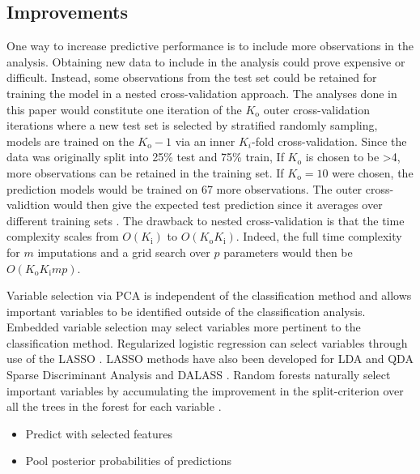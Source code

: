 \documentclass[12pt,]{article}
\providecommand{\tightlist}{%
  \setlength{\itemsep}{0pt}\setlength{\parskip}{0pt}}
\begin{document}
\subsection{Improvements}\label{improvements}

One way to increase predictive performance is to include more
observations in the analysis. Obtaining new data to include in the
analysis could prove expensive or difficult. Instead, some observations
from the test set could be retained for training the model in a nested
cross-validation approach. The analyses done in this paper would
constitute one iteration of the \(K_\text{o}\) outer cross-validation
iterations where a new test set is selected by stratified randomly
sampling, models are trained on the \(K_\text{o}-1\) via an inner
\(K_{i}\)-fold cross-validation. Since the data was originally split
into 25\% test and 75\% train, If \(K_\text{o}\) is chosen to be
\textgreater{}4, more observations can be retained in the training set.
If \(K_\text{o}=10\) were chosen, the prediction models would be trained
on 67 more observations. The outer cross-validtion would then give the
expected test prediction since it averages over different training sets
\autocite{hastie_elements_2009}. The drawback to nested cross-validation
is that the time complexity scales from \(O(K_\text{i})\) to
\(O(K_\text{o}K_\text{i})\). Indeed, the full time complexity for \(m\)
imputations and a grid search over \(p\) parameters would then be
\(O(K_\text{o}K_\text{i}mp)\).

Variable selection via PCA is independent of the classification method
and allows important variables to be identified outside of the
classification analysis. Embedded variable selection may select
variables more pertinent to the classification method. Regularized
logistic regression can select variables through use of the LASSO
\autocite{tibshirani_regression_1996}. LASSO methods have also been
developed for LDA and QDA Sparse Discriminant Analysis
\autocite{clemmensen_sparse_2011} and DALASS
\autocite{trendafilov_dalass:_2007}. Random forests naturally select
important variables by accumulating the improvement in the
split-criterion over all the trees in the forest for each variable
\autocite[pp.~593]{hastie_elements_2009}.

\begin{itemize}
\tightlist
\item
  Predict with selected features
\item
  Pool posterior probabilities of predictions
\end{itemize}
\end{document}
